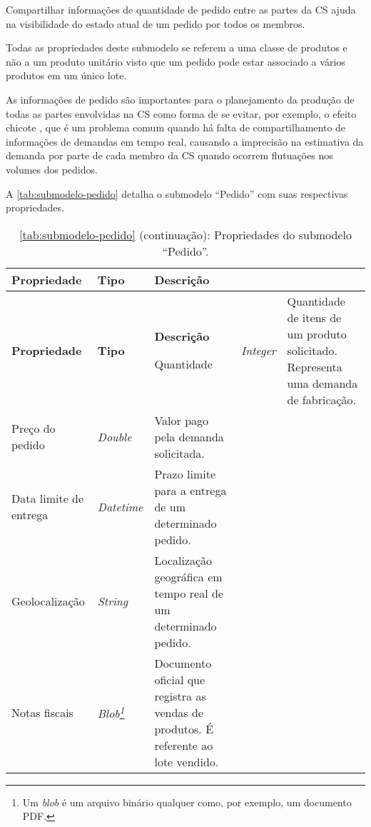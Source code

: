 Compartilhar informações de quantidade de pedido entre as partes da CS ajuda na visibilidade do estado atual de um pedido por todos os membros.

Todas as propriedades deste submodelo se referem a uma classe de produtos e não a um produto unitário visto que um pedido pode estar associado a vários produtos em um único lote.

As informações de pedido são importantes para o planejamento da produção de todas as partes envolvidas na CS como forma de se evitar, por exemplo, o efeito chicote \cite{lee1997bullwhip}, que é um problema comum quando há falta de compartilhamento de informações de demandas em tempo real, causando a imprecisão na estimativa da demanda por parte de cada membro da CS quando ocorrem flutuações nos volumes dos pedidos.

A \autoref{tab:submodelo-pedido} detalha o submodelo ``Pedido'' com suas respectivas propriedades.

\begin{longtable}{|p{}|p{}|p{}|}

	\caption{\label{tab:submodelo-pedido} Propriedades do submodelo ``Pedido''.}
	\\ \hline \textbf{Propriedade} & \textbf{Tipo} & \textbf{Descrição}
	\endfirsthead

	\caption*{\autoref{tab:submodelo-pedido} (continuação): Propriedades do submodelo ``Pedido''.}
	\\ \hline \textbf{Propriedade} & \textbf{Tipo}    & \textbf{Descrição}
	\endhead

	\hline Quantidade & \textit{Integer} & Quantidade de itens de um produto solicitado. Representa uma demanda de fabricação.

	\\ \hline Preço do pedido & \textit{Double} & Valor pago pela demanda solicitada.

	\\ \hline Data limite de entrega & \textit{Datetime} & Prazo limite para a entrega de um determinado pedido.

	\\ \hline Geolocalização & \textit{String} & Localização geográfica em tempo real de um determinado pedido.

	\\ \hline Notas fiscais & \textit{Blob\footnote{Um \textit{blob} é um arquivo binário qualquer como, por exemplo, um documento PDF.}} & Documento oficial que registra as vendas de produtos. É referente ao lote vendido.

	\\ \hline
\end{longtable}

